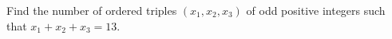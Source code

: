 Find the number of ordered triples $(x_1,x_2,x_3)$ of odd positive integers such that $x_1+x_2+x_3=13$.
